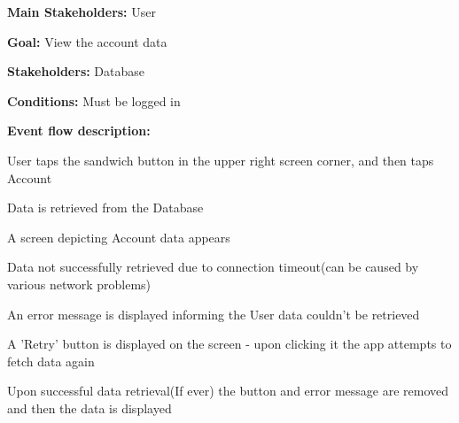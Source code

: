 				\noindent {}
				\begin{packed_item}
					\item \textbf{Main Stakeholders:} User
					\item \textbf{Goal:} View the account data
					\item \textbf{Stakeholders:} Database
					\item \textbf{Conditions:} Must be logged in
					\item \textbf{Event flow description: }
					\begin{packed_enum}
						\item User taps the sandwich button in the upper right screen corner, and then taps Account
						\item Data is retrieved from the Database
						\item A screen depicting Account data appears
					\end{packed_enum}
					
					\begin{packed_item}
						\item[2.a] Data not successfully retrieved due to connection timeout(can be caused by various network problems)
						\item[] \begin{packed_enum}
							\item An error message is displayed informing the User data couldn't be retrieved
							\item A 'Retry' button is displayed on the screen - upon clicking it the app attempts to fetch data again
							\item Upon successful data retrieval(If ever) the button and error message are removed and then the data is displayed
						\end{packed_enum}
					\end{packed_item}
				\end{packed_item}
			
